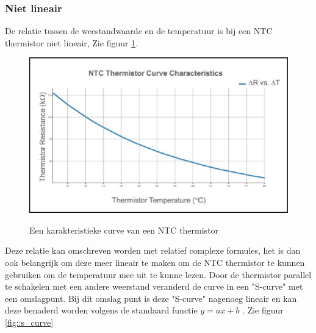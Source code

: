 \documentclass[a4paper, 11pt]{article} %
\begin{document}
	\subsubsection{Niet lineair}
	De relatie tussen de weestandwaarde en de temperatuur is bij een NTC thermistor niet lineair, Zie figuur \ref{fig::thermistorCurve}. 
	\begin{figure}[h!]
		\centering
		\hspace*{-1cm} 
		\includegraphics[width=1.2\linewidth]{../Media/thermistorCurve.png}
		\caption{Een karakteristieke curve van een NTC thermistor} \cite{thermistorCurve}
		\label{fig::thermistorCurve}
	\end{figure}
	Deze relatie kan omschreven worden met relatief complexe formules, het is dan ook belangrijk om deze meer lineair te maken om de NTC thermistor te kunnen gebruiken om de temperatuur mee uit te kunne lezen. Door de thermistor parallel te schakelen met een andere weerstand veranderd de curve in een "S-curve" met een omslagpunt. Bij dit omslag punt is deze "S-curve" nagenoeg lineair en kan deze benaderd worden volgens de standaard functie
	\begin{math}
		y = ax + b
	\end{math} \cite{TDK}.
	Zie figuur \ref{fig::s_curve}
	\newpage
\end{document}
